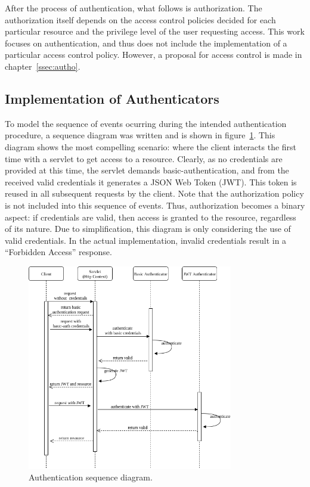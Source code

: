 \documentclass[12pt]{article}
\begin{document}
After the process of authentication, what follows is authorization. The authorization itself depends on the access control policies decided for each particular resource and the privilege level of the user requesting access. This work focuses on authentication, and thus does not include the implementation of a particular access control policy. However, a proposal for access control is made in chapter~\ref{ssec:autho}.

\subsection{Implementation of Authenticators}
\label{ssec:impl}

To model the sequence of events ocurring during the intended authentication procedure, a sequence diagram was written and is shown in figure~\ref{fig:esh_auth_sequence}. This diagram shows the most compelling scenario: where the client interacts the first time with a servlet to get access to a resource. Clearly, as no credentials are provided at this time, the servlet demands basic-authentication, and from the received valid credentials it generates a JSON Web Token (JWT). This token is reused in all subsequent requests by the client. Note that the authorization policy is not included into this sequence of events. Thus, authorization becomes a binary aspect: if credentials are valid, then access is granted to the resource, regardless of its nature. Due to simplification, this diagram is only considering the use of valid credentials. In the actual implementation, invalid credentials result in a ``Forbidden Access'' response. 

\begin{figure} [ht] 
\begin{center}
\includegraphics[width=0.8\textwidth]{esh_auth_sequence}
\caption{Authentication sequence diagram.}
\label{fig:esh_auth_sequence}
\end{center}
\end{figure}
\end{document}
